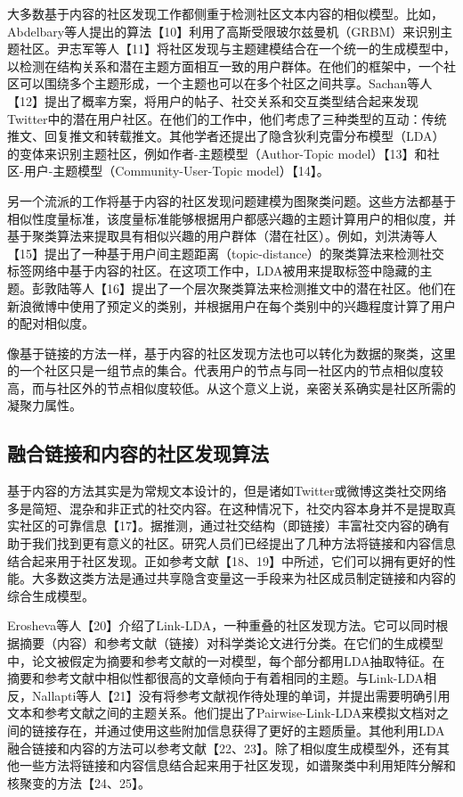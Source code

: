 大多数基于内容的社区发现工作都侧重于检测社区文本内容的相似模型。比如，Abdelbary等人提出的算法【10】利用了高斯受限玻尔兹曼机（GRBM）来识别主题社区。尹志军等人【11】将社区发现与主题建模结合在一个统一的生成模型中，以检测在结构关系和潜在主题方面相互一致的用户群体。在他们的框架中，一个社区可以围绕多个主题形成，一个主题也可以在多个社区之间共享。Sachan等人【12】提出了概率方案，将用户的帖子、社交关系和交互类型结合起来发现Twitter中的潜在用户社区。在他们的工作中，他们考虑了三种类型的互动：传统推文、回复推文和转载推文。其他学者还提出了隐含狄利克雷分布模型（LDA）的变体来识别主题社区，例如作者-主题模型（Author-Topic model）【13】和社区-用户-主题模型（Community-User-Topic model）【14】。

另一个流派的工作将基于内容的社区发现问题建模为图聚类问题。这些方法都基于相似性度量标准，该度量标准能够根据用户都感兴趣的主题计算用户的相似度，并基于聚类算法来提取具有相似兴趣的用户群体（潜在社区）。例如，刘洪涛等人【15】提出了一种基于用户间主题距离（topic-distance）的聚类算法来检测社交标签网络中基于内容的社区。在这项工作中，LDA被用来提取标签中隐藏的主题。彭敦陆等人【16】提出了一个层次聚类算法来检测推文中的潜在社区。他们在新浪微博中使用了预定义的类别，并根据用户在每个类别中的兴趣程度计算了用户的配对相似度。

像基于链接的方法一样，基于内容的社区发现方法也可以转化为数据的聚类，这里的一个社区只是一组节点的集合。代表用户的节点与同一社区内的节点相似度较高，而与社区外的节点相似度较低。从这个意义上说，亲密关系确实是社区所需的凝聚力属性。

\subsection{融合链接和内容的社区发现算法}

基于内容的方法其实是为常规文本设计的，但是诸如Twitter或微博这类社交网络多是简短、混杂和非正式的社交内容。在这种情况下，社交内容本身并不是提取真实社区的可靠信息【17】。据推测，通过社交结构（即链接）丰富社交内容的确有助于我们找到更有意义的社区。研究人员们已经提出了几种方法将链接和内容信息结合起来用于社区发现。正如参考文献【18、19】中所述，它们可以拥有更好的性能。大多数这类方法是通过共享隐含变量这一手段来为社区成员制定链接和内容的综合生成模型。

Erosheva等人【20】介绍了Link-LDA，一种重叠的社区发现方法。它可以同时根据摘要（内容）和参考文献（链接）对科学类论文进行分类。在它们的生成模型中，论文被假定为摘要和参考文献的一对模型，每个部分都用LDA抽取特征。在摘要和参考文献中相似性都很高的文章倾向于有着相同的主题。与Link-LDA相反，Nallapti等人【21】没有将参考文献视作待处理的单词，并提出需要明确引用文本和参考文献之间的主题关系。他们提出了Pairwise-Link-LDA来模拟文档对之间的链接存在，并通过使用这些附加信息获得了更好的主题质量。其他利用LDA融合链接和内容的方法可以参考文献【22、23】。除了相似度生成模型外，还有其他一些方法将链接和内容信息结合起来用于社区发现，如谱聚类中利用矩阵分解和核聚变的方法【24、25】。

